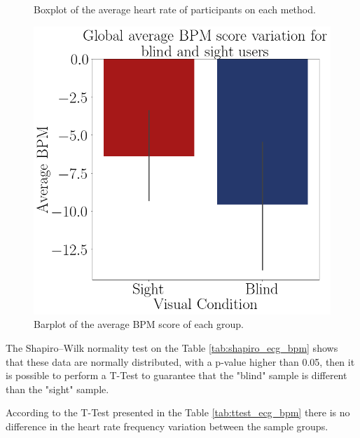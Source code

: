 \begin{figure}[!htb]
\begin{minipage}{.45\linewidth}
        \caption{Boxplot of the average heart rate of participants on each method.}
        \label{fig:boxplot_ecg_bpm_scene}
    \end{minipage}
    \begin{minipage}{.1\linewidth}
        \hfill
    \end{minipage}
    \begin{minipage}{.45\linewidth}
        \vspace{1.8cm}
        \centering
        \includegraphics[width = \linewidth]{Resultados/ECG/Figuras/png/barplot_ecg_bpm_global.png}
        \caption{Barplot of the average BPM score of each group.}
        \label{fig:barplot_ecg_bpm_global}
    \end{minipage}
\end{figure}

The Shapiro–Wilk normality test on the Table \ref{tab:shapiro_ecg_bpm} shows that these data are normally distributed, with a p-value higher than 0.05, then it is possible to perform a T-Test to guarantee that the "blind" sample is different than the "sight" sample.

According to the T-Test presented in the Table \ref{tab:ttest_ecg_bpm} there is no difference in the heart rate frequency variation between the sample groups.

